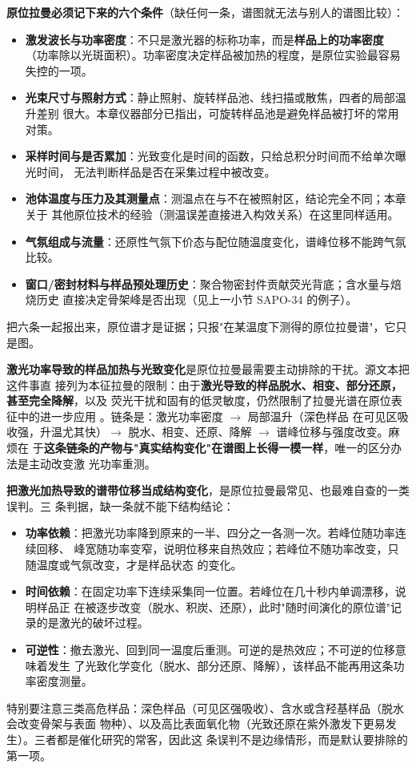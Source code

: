 \begin{measure}
\textbf{原位拉曼必须记下来的六个条件}（缺任何一条，谱图就无法与别人的谱图比较）：
\begin{itemize}
\item \textbf{激发波长与功率密度}：不只是激光器的标称功率，而是\textbf{样品上的功率密度}
  （功率除以光斑面积）。功率密度决定样品被加热的程度，是原位实验最容易失控的一项。
\item \textbf{光束尺寸与照射方式}：静止照射、旋转样品池、线扫描或散焦，四者的局部温升差别
  很大。本章仪器部分已指出，可旋转样品池是避免样品被打坏的常用对策。
\item \textbf{采样时间与是否累加}：光致变化是时间的函数，只给总积分时间而不给单次曝光时间，
  无法判断样品是否在采集过程中被改变。
\item \textbf{池体温度与压力及其测量点}：测温点在与不在被照射区，结论完全不同；本章关于
  其他原位技术的经验（测温误差直接进入构效关系）在这里同样适用。
\item \textbf{气氛组成与流量}：还原性气氛下价态与配位随温度变化，谱峰位移不能跨气氛比较。
\item \textbf{窗口/密封材料与样品预处理历史}：聚合物密封件贡献荧光背底；含水量与焙烧历史
  直接决定骨架峰是否出现（见上一小节 SAPO-34 的例子）。
\end{itemize}
把六条一起报出来，原位谱才是证据；只报"在某温度下测得的原位拉曼谱"，它只是图。
\end{measure}

\textbf{激光功率导致的样品加热与光致变化}是原位拉曼最需要主动排除的干扰。源文本把这件事直
接列为本征拉曼的限制：由于\textbf{激光导致的样品脱水、相变、部分还原，甚至完全降解}，以及
荧光干扰和固有的低灵敏度，仍然限制了拉曼光谱在原位表征中的进一步应用
。链条是：激光功率密度 $\to$ 局部温升（深色样品
在可见区吸收强，升温尤其快）$\to$ 脱水、相变、还原、降解 $\to$ 谱峰位移与强度改变。麻烦在
于\textbf{这条链条的产物与"真实结构变化"在谱图上长得一模一样}，唯一的区分办法是主动改变激
光功率重测。

\begin{pitfall}
\textbf{把激光加热导致的谱带位移当成结构变化}，是原位拉曼最常见、也最难自查的一类误判。三
条判据，缺一条就不能下结构结论：
\begin{itemize}
\item \textbf{功率依赖}：把激光功率降到原来的一半、四分之一各测一次。若峰位随功率连续回移、
  峰宽随功率变窄，说明位移来自热效应；若峰位不随功率改变，只随温度或气氛改变，才是样品状态
  的变化。
\item \textbf{时间依赖}：在固定功率下连续采集同一位置。若峰位在几十秒内单调漂移，说明样品正
  在被逐步改变（脱水、积炭、还原），此时"随时间演化的原位谱"记录的是激光的破坏过程。
\item \textbf{可逆性}：撤去激光、回到同一温度后重测。可逆的是热效应；不可逆的位移意味着发生
  了光致化学变化（脱水、部分还原、降解），该样品不能再用这条功率密度测量。
\end{itemize}
特别要注意三类高危样品：深色样品（可见区强吸收）、含水或含羟基样品（脱水会改变骨架与表面
物种）、以及高比表面氧化物（光致还原在紫外激发下更易发生）。三者都是催化研究的常客，因此这
条误判不是边缘情形，而是默认要排除的第一项。
\end{pitfall}

